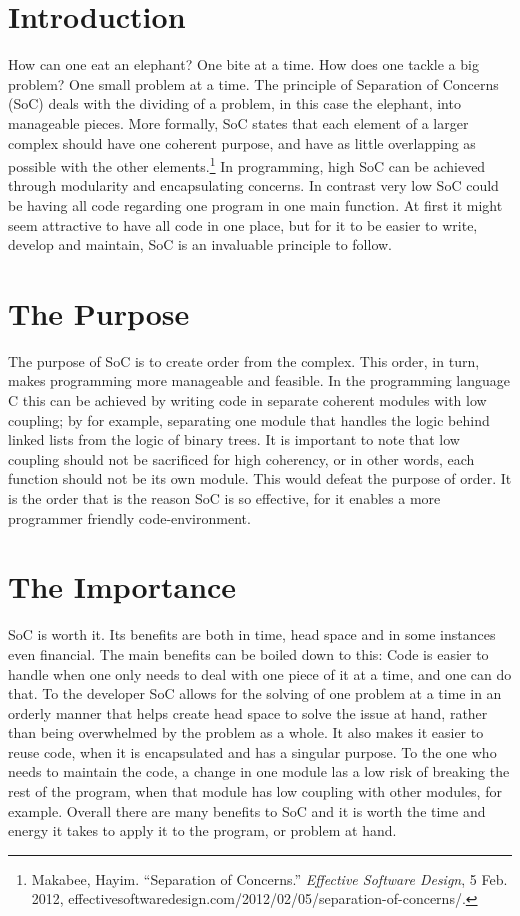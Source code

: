 \documentclass[11pt,a4paper]{article}
\begin{document}
\pagebreak
\maketitle
\begin{flushleft}
\section{Introduction}
How can one eat an elephant? One bite at a time. How does one tackle a big problem? One small problem at a time. The principle of Separation of Concerns (SoC) deals with the dividing of a problem, in this case the elephant, into manageable pieces. More formally, SoC states that each element of a larger complex should have one coherent purpose, and have as little overlapping as possible with the other elements.\footnote{Makabee, Hayim. “Separation of Concerns.” \textit{Effective Software Design}, 5 Feb. 2012, effectivesoftwaredesign.com/2012/02/05/separation-of-concerns/.} In programming, high SoC can be achieved through modularity and encapsulating concerns. In contrast very low SoC could be having all code regarding one program in one main function. At first it might seem attractive to have all code in one place, but for it to be easier to write, develop and maintain, SoC is an invaluable principle to follow.

\section{The Purpose}

The purpose of SoC is to create order from the complex. This order, in turn, makes programming more manageable and feasible. In the programming language C this can be achieved by writing code in separate coherent modules with low coupling; by for example, separating one module that handles the logic behind linked lists from the logic of binary trees. It is important to note that low coupling should not be sacrificed for high coherency, or in other words, each function should not be its own module. This would defeat the purpose of order. It is the order that is the reason SoC is so effective, for it enables a more programmer friendly code-environment.
\section{The Importance}
SoC is worth it. Its benefits are both in time, head space and in some instances even financial. The main benefits can be boiled down to this: Code is easier to handle when one only needs to deal with one piece of it at a time, and one can do that. To the developer SoC allows for the solving of one problem at a time in an orderly manner that helps create head space to solve the issue at hand, rather than being overwhelmed by the problem as a whole. It also makes it easier to reuse code, when it is encapsulated and has a singular purpose. To the one who needs to maintain the code, a change in one module las a low risk of breaking the rest of the program, when that module has low coupling with other modules, for example. Overall there are many benefits to SoC and it is worth the time and energy it takes to apply it to the program, or problem at hand.


\end{flushleft}
\end{document}
